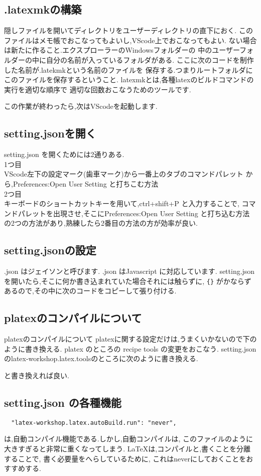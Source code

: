 \documentclass{ltjsarticle}
\begin{document}
\subsection{.latexmkの構築} %

\label{sub:.latexmkの構築}
隠しファイルを開いてディレクトリをユーザーディレクトリの直下におく.
このファイルはメモ帳でおこなってもよいし,VScode上でおこなってもよい.
ない場合は新たに作ること.エクスプローラーのWindowsフォルダーの
中のユーザーフォルダーの中に自分の名前が入っているフォルダがある.
ここに次のコードを制作した名前が.latekmkという名前のファイルを
保存する.つまりルートフォルダにこのファイルを保存するということ.
latexmkとは,各種latexのビルドコマンドの実行を適切な順序で
適切な回数おこなうためのツールです.


この作業が終わったら,次はVScodeを起動します.
\subsection{setting.jsonを開く}
setting.json を開くためには2通りある.\\
1つ目\\
VScode左下の設定マーク(歯車マーク)から一番上のタブのコマンドパレット
から,Preferences:Open User Setting と打ちこむ方法\\
2つ目\\
キーボードのショートカットキーを用いて,ctrl+shift+P と入力することで,
コマンドパレットを出現させ,そこにPreferences:Open User Setting
と打ち込む方法\\
の2つの方法があり,熟練したら2番目の方法の方が効率が良い.
\subsection{setting.jsonの設定}
.json はジェイソンと呼びます.
.json はJavascript に対応しています.
setting.json を開いたら,そこに何か書き込まれていた場合それには触らずに,
\verb|{}|
がかならずあるので,その中に次のコードをコピーして張り付ける.

\subsection{platexのコンパイルについて}
platexのコンパイルについて
platexに関する設定だけは,うまくいかないので下のように書き換える.
platex のところの
recipe tools の変更をおこなう.
setting.jsonのlatex-workshop.latex.toolsのところに次のように書き換える.

と書き換えれば良い.
\subsection{setting.json の各種機能}
\begin{verbatim}
  "latex-workshop.latex.autoBuild.run": "never",
\end{verbatim}
は,自動コンパイル機能である.しかし,自動コンパイルは,
このファイルのように大きすぎると非常に重くなってしまう.
\LaTeX は,コンパイルと,書くことを分離することで,
書く必要量をへらしているために,
これはneverにしておくことをおすすめする.
\end{document}

